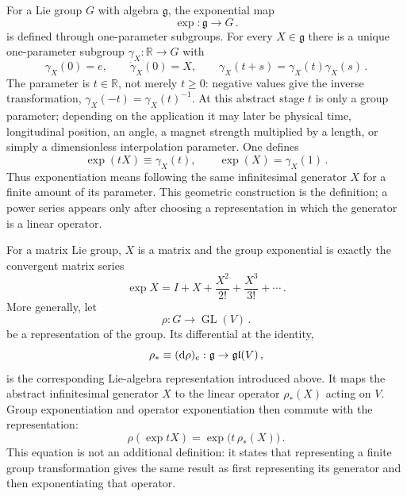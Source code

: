 For a Lie group $G$ with algebra $\mathfrak{g}$, the exponential map
\begin{equation}
    \exp:\mathfrak{g}\longrightarrow G\,.
\end{equation}
is defined through one-parameter subgroups.  For every $X\in\mathfrak g$
there is a unique one-parameter subgroup $\gamma_X:\mathbb R\to G$ with
\begin{equation}
    \gamma_X(0) = e,\qquad
    \dot\gamma_X(0) = X,\qquad
    \gamma_X(t + s) = \gamma_X(t)\gamma_X(s)\,.
\end{equation}
The parameter is $t\in\mathbb R$, not merely $t\ge0$: negative values give
the inverse transformation,
$\gamma_X(-t) = \gamma_X(t)^{-1}$.  At this abstract stage $t$ is only a group
parameter; depending on the application it may later be physical time,
longitudinal position, an angle, a magnet strength multiplied by a length, or
simply a dimensionless interpolation parameter.  One defines
\begin{equation}
    \exp(tX)\equiv\gamma_X(t),\qquad \exp(X) = \gamma_X(1)\,.
\end{equation}
Thus exponentiation means following the same infinitesimal generator $X$ for
a finite amount of its parameter.  This geometric construction is the
definition; a power series appears only after choosing a representation in
which the generator is a linear operator.

For a matrix Lie group, $X$ is a matrix and the group exponential is exactly
the convergent matrix series
\begin{equation}\label{eq:matrix-exponential}
    \exp X = I + X + \frac{X^2}{2!} + \frac{X^3}{3!} + \cdots\,.
\end{equation}
More generally, let
\begin{equation}
    \rho:G\to\operatorname{GL}(V)\,.
\end{equation}
be a representation of the group.  Its differential at the identity,
\begin{equation}
    \rho_*\equiv(\text{d}\rho)_e:
    \mathfrak g\to\mathfrak{gl}(V)\,,
\end{equation}
is the corresponding Lie-algebra representation introduced above.  It maps
the abstract infinitesimal generator $X$ to the linear operator
$\rho_*(X)$ acting on $V$.  Group exponentiation and operator exponentiation
then commute with the representation:
\begin{equation}\label{eq:representation-exponential}
    \rho(\exp tX) = \exp\!\bigl(t\,\rho_*(X)\bigr)\,.
\end{equation}
This equation is not an additional definition: it states that representing a
finite group transformation gives the same result as first representing its
generator and then exponentiating that operator.

